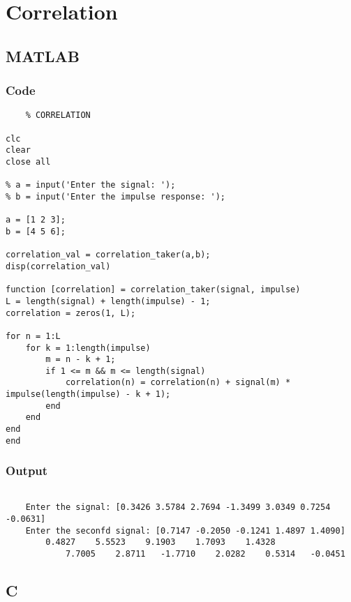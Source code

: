 \documentclass{article}
\begin{document}
\section{Correlation}

\subsection{MATLAB}
\subsubsection{Code}
\begin{lstlisting}
    % CORRELATION

clc
clear
close all

% a = input('Enter the signal: ');
% b = input('Enter the impulse response: ');

a = [1 2 3];
b = [4 5 6];

correlation_val = correlation_taker(a,b);
disp(correlation_val)

function [correlation] = correlation_taker(signal, impulse)
L = length(signal) + length(impulse) - 1;
correlation = zeros(1, L);

for n = 1:L
    for k = 1:length(impulse)
        m = n - k + 1;
        if 1 <= m && m <= length(signal)
            correlation(n) = correlation(n) + signal(m) * impulse(length(impulse) - k + 1);
        end
    end
end
end
\end{lstlisting}

\subsubsection{Output}
\begin{lstlisting}
    
    Enter the signal: [0.3426 3.5784 2.7694 -1.3499 3.0349 0.7254 -0.0631]
    Enter the seconfd signal: [0.7147 -0.2050 -0.1241 1.4897 1.4090]
        0.4827    5.5523    9.1903    1.7093    1.4328    
            7.7005    2.8711   -1.7710    2.0282    0.5314   -0.0451

\end{lstlisting}


\subsection{C}
\end{document}
